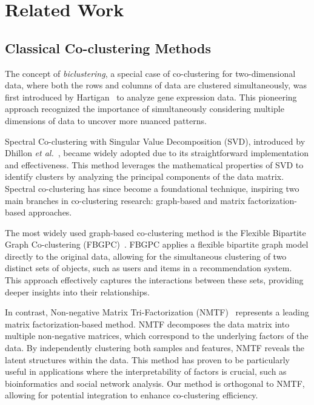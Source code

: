\documentclass[journal]{IEEEtran}
\theoremstyle{definition}
\theoremstyle{remark} %
\renewcommand{\cite}[1]{~\autocite{#1}}
\begin{document}
\section{Related Work}
\label{sec:related-work}
\subsection{Classical Co-clustering Methods}
The concept of \emph{biclustering}, a special case of co-clustering for two-dimensional data, where both the rows and columns of data are clustered simultaneously, was first introduced by Hartigan\cite{hartigan1972DirectClusteringData} to analyze gene expression data. This pioneering approach recognized the importance of simultaneously considering multiple dimensions of data to uncover more nuanced patterns.

Spectral Co-clustering with Singular Value Decomposition (SVD), introduced by Dhillon \textit{et al.}\cite{dhillon2001CoclusteringDocumentsWords}, became widely adopted due to its straightforward implementation and effectiveness. This method leverages the mathematical properties of SVD to identify clusters by analyzing the principal components of the data matrix. Spectral co-clustering has since become a foundational technique, inspiring two main branches in co-clustering research: graph-based and matrix factorization-based approaches.

The most widely used graph-based co-clustering method is the Flexible Bipartite Graph Co-clustering (FBGPC)\cite{chen2023FastFlexibleBipartitea}. FBGPC applies a flexible bipartite graph model directly to the original data, allowing for the simultaneous clustering of two distinct sets of objects, such as users and items in a recommendation system. This approach effectively captures the interactions between these sets, providing deeper insights into their relationships.

In contrast, Non-negative Matrix Tri-Factorization (NMTF)\cite{long2005CoclusteringBlockValue} represents a leading matrix factorization-based method. NMTF decomposes the data matrix into multiple non-negative matrices, which correspond to the underlying factors of the data. By independently clustering both samples and features, NMTF reveals the latent structures within the data. This method has proven to be particularly useful in applications where the interpretability of factors is crucial, such as bioinformatics and social network analysis. Our method is orthogonal to NMTF, allowing for potential integration to enhance co-clustering efficiency.
\end{document}
